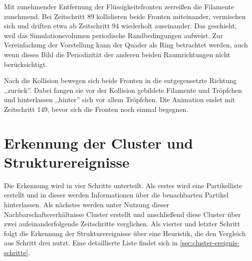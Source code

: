 Mit zunehmender Entfernung der Flüssigkeitsfronten zerreißen die Filamente zunehmend. Bei Zeitschritt 89 kollidieren beide Fronten miteinander, vermischen sich und driften etwa ab Zeitschritt 94 wiederholt auseinander. Das geschieht, weil das Simulationsvolumen periodische Randbedingungen aufweist. Zur Vereinfachung der Vorstellung kann der Quader als Ring betrachtet werden, auch wenn dieses Bild die Periodizität der anderen beiden Raumrichtungen nicht berücksichtigt.

Nach die Kollision bewegen sich beide Fronten in die entgegensetzte Richtung ,,zurück''. Dabei fangen sie vor der Kollision gebildete Filamente und Tröpfchen und hinterlassen ,,hinter'' sich vor allem Tröpfchen. Die Animation endet mit Zeitschritt 149, bevor sich die Fronten noch einmal begegnen.









\chapter{Erkennung der Cluster und Strukturereignisse}

Die Erkennung wird in vier Schritte unterteilt. Als erstes wird eine Partikelliste erstellt und in dieser werden Informationen über die benachbarten Partikel hinterlassen. Als nächstes werden unter Nutzung dieser Nachbarschaftsverhältnisse Cluster erstellt und anschließend diese Cluster über zwei aufeinanderfolgende Zeitschritte verglichen. Als vierter und letzter Schritt folgt die Erkennung der Strukturereignisse über eine Heuristik, die den Vergleich aus Schritt drei nutzt. Eine detaillierte Liste findet sich in \autoref{sec:cluster-ereignis-schritte}.


